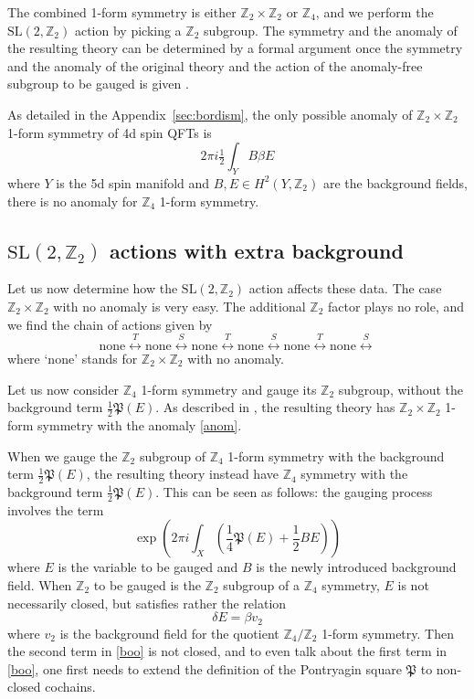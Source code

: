 \documentclass[12pt]{article}
\numberwithin{equation}{section}
\def\bZ{\mathbb{Z}}
\def\SL{\mathrm{SL}}
\begin{document}
The combined 1-form symmetry is either $\bZ_2\times \bZ_2$ or $\bZ_4$,
and we perform the $\SL(2,\bZ_2)$ action  by picking a $\bZ_2$ subgroup.
The symmetry and the anomaly of the resulting theory can be determined by a formal argument once the symmetry and the anomaly of the original theory 
and the action of the anomaly-free subgroup to be gauged is given \cite{Tachikawa:2017gyf}.

As detailed in the Appendix~\ref{sec:bordism}, the only possible anomaly of $\bZ_2\times \bZ_2$ 1-form symmetry of 4d spin QFTs is \begin{equation}
2\pi i \tfrac12 \int_Y B\beta E  \label{anom}
\end{equation} where $Y$ is the 5d spin manifold and $B,E\in H^2(Y,\bZ_2)$ are the background fields,
there is no anomaly for $\bZ_4$ 1-form symmetry.

\subsection{$\SL(2,\bZ_2)$ actions with extra background }

Let us now determine how the $\SL(2,\bZ_2)$ action affects these data.
The case $\bZ_2\times \bZ_2$ with no anomaly is very easy.
The additional $\bZ_2$ factor plays no role, and we find the chain of actions given by \begin{equation}
\text{none} \stackrel{T}{\longleftrightarrow} 
\text{none} \stackrel{S}{\longleftrightarrow} 
\text{none} \stackrel{T}{\longleftrightarrow} 
\text{none} \stackrel{S}{\longleftrightarrow} 
\text{none} \stackrel{T}{\longleftrightarrow} 
\text{none} \stackrel{S}{\longleftrightarrow} 
\label{trivial-chain}
\end{equation} where `none' stands for $\bZ_2\times \bZ_2$ with no anomaly.

Let us now consider $\bZ_4$ 1-form symmetry and gauge its $\bZ_2$ subgroup,
without the background term $\frac12\mathfrak{P}(E)$.
As described in \cite{Tachikawa:2017gyf},
the resulting theory has $\bZ_2\times \bZ_2$ 1-form symmetry with the anomaly \eqref{anom}.

When we gauge the $\bZ_2$ subgroup  of $\bZ_4$ 1-form symmetry 
with the background term $\frac12\mathfrak{P}(E)$,
the resulting theory instead have $\bZ_4$ symmetry
with the background term $\frac12\mathfrak{P}(E)$.
This can be seen as follows:
the gauging process involves the term
 \begin{equation}
\exp\left(2\pi i\int_X ( \frac14 \mathfrak{P}(E) +\frac12 B E)\right)
\label{boo}
\end{equation}
where $E$ is the variable to be gauged and $B$ is the newly introduced background field.
When $\bZ_2$ to be gauged is the $\bZ_2$ subgroup of a $\bZ_4$ symmetry,
$E$ is not necessarily closed, but satisfies rather the relation \begin{equation}
\delta E = \beta v_2
\end{equation}
where $v_2$ is the background field for the quotient $\bZ_4/\bZ_2$ 1-form symmetry.
Then the second term in \eqref{boo} is not closed, 
and to even talk about the first term in \eqref{boo}, one first needs to extend the definition of the Pontryagin square $\mathfrak{P}$ to non-closed cochains.
\end{document}
